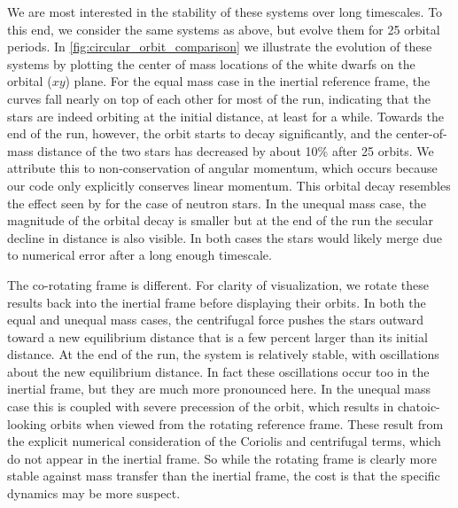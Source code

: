 \documentclass[iop,numberedappendix]{../emulateapj}
\begin{document}
\capstartfalse

\capstarttrue

We are most interested in the stability of these systems over long
timescales. To this end, we consider the same systems as above, but
evolve them for 25 orbital periods. In
\autoref{fig:circular_orbit_comparison} we illustrate the evolution of
these systems by plotting the center of mass locations of the white
dwarfs on the orbital ($xy$) plane. For the equal mass case in the
inertial reference frame, the curves fall nearly on top of each
other for most of the run, indicating that the stars are indeed 
orbiting at the initial distance, at least for a while. Towards the end 
of the run, however, the orbit starts to decay significantly, and the center-of-mass
distance of the two stars has decreased by about 10\% after 25 orbits.
We attribute this to non-conservation of angular momentum, which occurs 
because our code only explicitly conserves linear momentum. This orbital 
decay resembles the effect seen by \citet{swc:2000} for the case of neutron stars. 
In the unequal mass case, the magnitude of the orbital decay is smaller but 
at the end of the run the secular decline in distance is also visible. In 
both cases the stars would likely merge due to numerical error 
after a long enough timescale.

The co-rotating frame is different.  For clarity of visualization, we
rotate these results back into the inertial frame before displaying
their orbits.  In both the equal and unequal mass cases, the centrifugal force 
pushes the stars outward toward a new equilibrium distance that is a few 
percent larger than its initial distance. At the end of the run, the system is 
relatively stable, with oscillations about the new equilibrium distance. In fact 
these oscillations occur too in the inertial frame, but they are much more pronounced 
here. In the unequal mass case this is coupled with severe precession of the orbit, 
which results in chatoic-looking orbits when viewed from the rotating reference frame. 
These result from the explicit numerical consideration of the Coriolis and centrifugal 
terms, which do not appear in the inertial frame. So while the rotating frame 
is clearly more stable against mass transfer than the inertial frame,
the cost is that the specific dynamics may be more suspect.
\end{document}
